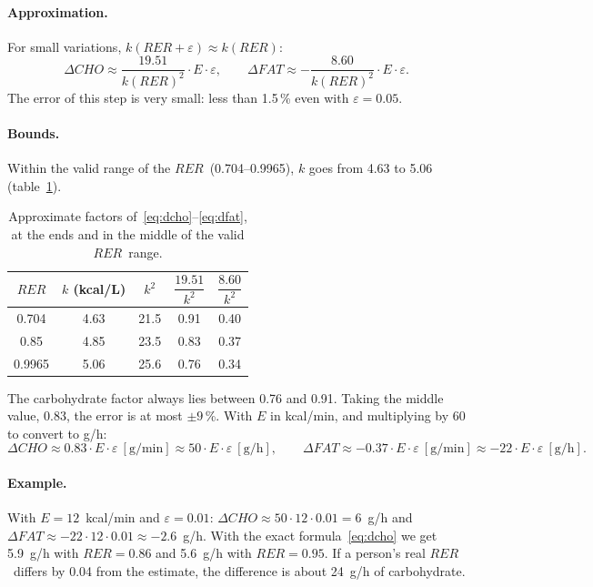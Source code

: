 \documentclass[10pt,a4paper]{article}
\newcommand{\cho}{\ensuremath{\mathit{CHO}}}               %
\newcommand{\fat}{\ensuremath{\mathit{FAT}}}
\newcommand{\RER}{\ensuremath{\mathit{RER}}}
\begin{document}
\paragraph{Approximation.} For small variations, $k(\RER+\varepsilon)\approx k(\RER)$:
\[
  \Delta\cho\approx\frac{19.51}{k(\RER)^2}\cdot E\cdot\varepsilon,\qquad
  \Delta\fat\approx-\frac{8.60}{k(\RER)^2}\cdot E\cdot\varepsilon .
\]
The error of this step is very small: less than 1.5\,\% even with $\varepsilon=0.05$.

\paragraph{Bounds.} Within the valid range of the \RER\ (0.704--0.9965), $k$ goes from 4.63
to 5.06 (table~\ref{tab:sens}).

\begin{table}[H]
\centering
\caption{Approximate factors of~\eqref{eq:dcho}--\eqref{eq:dfat}, at the ends and in the
middle of the valid \RER\ range.}
\label{tab:sens}
\small
\begin{tabular}{@{}ccccc@{}}
\toprule
\RER & $k$ (kcal/L) & $k^2$ & $\dfrac{19.51}{k^2}$ & $\dfrac{8.60}{k^2}$ \\[6pt]
\midrule
0.704  & 4.63 & 21.5 & 0.91 & 0.40 \\
0.85   & 4.85 & 23.5 & 0.83 & 0.37 \\
0.9965 & 5.06 & 25.6 & 0.76 & 0.34 \\
\bottomrule
\end{tabular}
\end{table}

\noindent The carbohydrate factor always lies between 0.76 and 0.91. Taking the middle
value, 0.83, the error is at most $\pm9$\,\%. With $E$ in kcal/min, and multiplying by 60
to convert to g/h:
\begin{equation}
  \Delta\cho\approx0.83\cdot E\cdot\varepsilon~[\mathrm{g/min}]
  \approx50\cdot E\cdot\varepsilon~[\mathrm{g/h}],\qquad
  \Delta\fat\approx-0.37\cdot E\cdot\varepsilon~[\mathrm{g/min}]
  \approx-22\cdot E\cdot\varepsilon~[\mathrm{g/h}].
\label{eq:dsimple}
\end{equation}

\paragraph{Example.} With $E=12$~kcal/min and $\varepsilon=0.01$:
$\Delta\cho\approx50\cdot12\cdot0.01=6$~g/h and $\Delta\fat\approx-22\cdot12\cdot0.01
\approx-2.6$~g/h. With the exact formula~\eqref{eq:dcho} we get 5.9~g/h with $\RER=0.86$
and 5.6~g/h with $\RER=0.95$. If a person's real \RER\ differs by 0.04 from the estimate,
the difference is about 24~g/h of carbohydrate.
\end{document}
